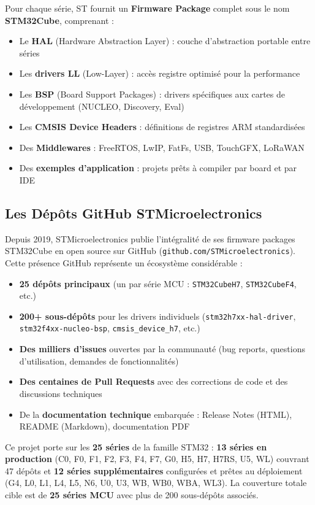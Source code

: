 \documentclass[12pt,a4paper]{report}
\begin{document}
Pour chaque série, ST fournit un \textbf{Firmware Package} complet sous le nom \textbf{STM32Cube}, comprenant :
\begin{itemize}
  \item Le \textbf{HAL} (Hardware Abstraction Layer) : couche d'abstraction portable entre séries
  \item Les \textbf{drivers LL} (Low-Layer) : accès registre optimisé pour la performance
  \item Les \textbf{BSP} (Board Support Packages) : drivers spécifiques aux cartes de développement (NUCLEO, Discovery, Eval)
  \item Les \textbf{CMSIS Device Headers} : définitions de registres ARM standardisées
  \item Des \textbf{Middlewares} : FreeRTOS, LwIP, FatFs, USB, TouchGFX, LoRaWAN
  \item Des \textbf{exemples d'application} : projets prêts à compiler par board et par IDE
\end{itemize}

\subsection{Les Dépôts GitHub STMicroelectronics}

Depuis 2019, STMicroelectronics publie l'intégralité de ses firmware packages STM32Cube en open source sur GitHub (\texttt{github.com/STMicroelectronics}). Cette présence GitHub représente un écosystème considérable :

\begin{itemize}
  \item \textbf{25 dépôts principaux} (un par série MCU : \texttt{STM32CubeH7}, \texttt{STM32CubeF4}, etc.)
  \item \textbf{200+ sous-dépôts} pour les drivers individuels (\texttt{stm32h7xx-hal-driver}, \texttt{stm32f4xx-nucleo-bsp}, \texttt{cmsis\_device\_h7}, etc.)
  \item \textbf{Des milliers d'issues} ouvertes par la communauté (bug reports, questions d'utilisation, demandes de fonctionnalités)
  \item \textbf{Des centaines de Pull Requests} avec des corrections de code et des discussions techniques
  \item De la \textbf{documentation technique} embarquée : Release Notes (HTML), README (Markdown), documentation PDF
\end{itemize}

Ce projet porte sur les \textbf{25 séries} de la famille STM32 : \textbf{13 séries en production} (C0, F0, F1, F2, F3, F4, F7, G0, H5, H7, H7RS, U5, WL) couvrant 47 dépôts et \textbf{12 séries supplémentaires} configurées et prêtes au déploiement (G4, L0, L1, L4, L5, N6, U0, U3, WB, WB0, WBA, WL3). La couverture totale cible est de \textbf{25 séries MCU} avec plus de 200 sous-dépôts associés.
\end{document}

